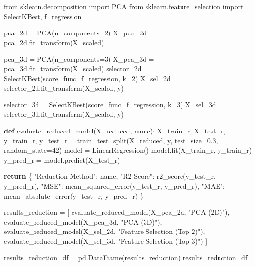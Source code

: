 \documentclass[
  letterpaper,
  DIV=11,
  numbers=noendperiod]{scrartcl}
\newenvironment{Shaded}{\begin{snugshade}}{\end{snugshade}}
\newcommand{\ControlFlowTok}[1]{\textcolor[rgb]{0.00,0.23,0.31}{\textbf{#1}}}
\newcommand{\DecValTok}[1]{\textcolor[rgb]{0.68,0.00,0.00}{#1}}
\newcommand{\FloatTok}[1]{\textcolor[rgb]{0.68,0.00,0.00}{#1}}
\newcommand{\ImportTok}[1]{\textcolor[rgb]{0.00,0.46,0.62}{#1}}
\newcommand{\KeywordTok}[1]{\textcolor[rgb]{0.00,0.23,0.31}{\textbf{#1}}}
\newcommand{\NormalTok}[1]{\textcolor[rgb]{0.00,0.23,0.31}{#1}}
\newcommand{\OperatorTok}[1]{\textcolor[rgb]{0.37,0.37,0.37}{#1}}
\newcommand{\StringTok}[1]{\textcolor[rgb]{0.13,0.47,0.30}{#1}}
\begin{document}
\begin{Shaded}
\begin{Highlighting}[]
\ImportTok{from}\NormalTok{ sklearn.decomposition }\ImportTok{import}\NormalTok{ PCA}
\ImportTok{from}\NormalTok{ sklearn.feature\_selection }\ImportTok{import}\NormalTok{ SelectKBest, f\_regression}

\NormalTok{pca\_2d }\OperatorTok{=}\NormalTok{ PCA(n\_components}\OperatorTok{=}\DecValTok{2}\NormalTok{)}
\NormalTok{X\_pca\_2d }\OperatorTok{=}\NormalTok{ pca\_2d.fit\_transform(X\_scaled)}

\NormalTok{pca\_3d }\OperatorTok{=}\NormalTok{ PCA(n\_components}\OperatorTok{=}\DecValTok{3}\NormalTok{)}
\NormalTok{X\_pca\_3d }\OperatorTok{=}\NormalTok{ pca\_3d.fit\_transform(X\_scaled)}
\NormalTok{selector\_2d }\OperatorTok{=}\NormalTok{ SelectKBest(score\_func}\OperatorTok{=}\NormalTok{f\_regression, k}\OperatorTok{=}\DecValTok{2}\NormalTok{)}
\NormalTok{X\_sel\_2d }\OperatorTok{=}\NormalTok{ selector\_2d.fit\_transform(X\_scaled, y)}

\NormalTok{selector\_3d }\OperatorTok{=}\NormalTok{ SelectKBest(score\_func}\OperatorTok{=}\NormalTok{f\_regression, k}\OperatorTok{=}\DecValTok{3}\NormalTok{)}
\NormalTok{X\_sel\_3d }\OperatorTok{=}\NormalTok{ selector\_3d.fit\_transform(X\_scaled, y)}

\KeywordTok{def}\NormalTok{ evaluate\_reduced\_model(X\_reduced, name):}
\NormalTok{    X\_train\_r, X\_test\_r, y\_train\_r, y\_test\_r }\OperatorTok{=}\NormalTok{ train\_test\_split(X\_reduced, y, test\_size}\OperatorTok{=}\FloatTok{0.3}\NormalTok{, random\_state}\OperatorTok{=}\DecValTok{42}\NormalTok{)}
\NormalTok{    model }\OperatorTok{=}\NormalTok{ LinearRegression()}
\NormalTok{    model.fit(X\_train\_r, y\_train\_r)}
\NormalTok{    y\_pred\_r }\OperatorTok{=}\NormalTok{ model.predict(X\_test\_r)}
    
    \ControlFlowTok{return}\NormalTok{ \{}
        \StringTok{"Reduction Method"}\NormalTok{: name,}
        \StringTok{"R2 Score"}\NormalTok{: r2\_score(y\_test\_r, y\_pred\_r),}
        \StringTok{"MSE"}\NormalTok{: mean\_squared\_error(y\_test\_r, y\_pred\_r),}
        \StringTok{"MAE"}\NormalTok{: mean\_absolute\_error(y\_test\_r, y\_pred\_r)}
\NormalTok{    \}}

\NormalTok{results\_reduction }\OperatorTok{=}\NormalTok{ [}
\NormalTok{    evaluate\_reduced\_model(X\_pca\_2d, }\StringTok{"PCA (2D)"}\NormalTok{),}
\NormalTok{    evaluate\_reduced\_model(X\_pca\_3d, }\StringTok{"PCA (3D)"}\NormalTok{),}
\NormalTok{    evaluate\_reduced\_model(X\_sel\_2d, }\StringTok{"Feature Selection (Top 2)"}\NormalTok{),}
\NormalTok{    evaluate\_reduced\_model(X\_sel\_3d, }\StringTok{"Feature Selection (Top 3)"}\NormalTok{)}
\NormalTok{]}

\NormalTok{results\_reduction\_df }\OperatorTok{=}\NormalTok{ pd.DataFrame(results\_reduction)}
\NormalTok{results\_reduction\_df}
\end{Highlighting}
\end{Shaded}
\end{document}
